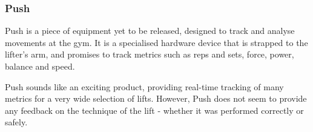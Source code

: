 \subsubsection{Push}

Push\cite{push} is a piece of equipment yet to be released, designed to track and analyse movements at the gym. It is a specialised hardware device that is strapped to the lifter's arm, and promises to track metrics such as reps and sets, force, power, balance and speed.

Push sounds like an exciting product, providing real-time tracking of many metrics for a very wide selection of lifts. However, Push does not seem to provide any feedback on the technique of the lift - whether it was performed correctly or safely.